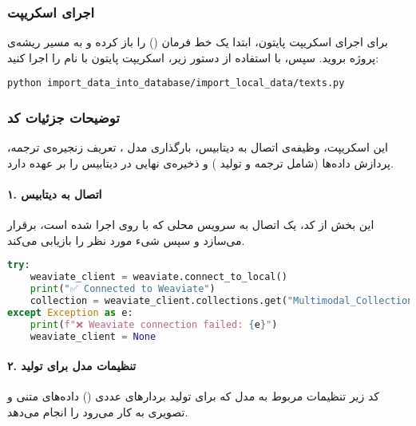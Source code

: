 \documentclass{article}
\begin{document}
\subsubsection{اجرای اسکریپت}

برای اجرای اسکریپت پایتون، ابتدا یک خط فرمان () را باز کرده و به مسیر ریشه‌ی پروژه بروید. سپس، با استفاده از دستور زیر، اسکریپت پایتون با نام  را اجرا کنید:

\begin{latin}
\begin{lstlisting}
python import_data_into_database/import_local_data/texts.py
\end{lstlisting}
\end{latin}

\subsubsection{توضیحات جزئیات کد}

این اسکریپت، وظیفه‌ی اتصال به دیتابیس، بارگذاری مدل ، تعریف زنجیره‌ی ترجمه، پردازش داده‌ها (شامل ترجمه و تولید ) و ذخیره‌ی نهایی در دیتابیس  را بر عهده دارد.

\paragraph{۱. اتصال به دیتابیس }

این بخش از کد، یک اتصال به سرویس محلی  که با  روی  اجرا شده است، برقرار می‌سازد و سپس شیء  مورد نظر را بازیابی می‌کند.

\begin{latin}
\begin{lstlisting}[language=Python]
try:
    weaviate_client = weaviate.connect_to_local()
    print("✅ Connected to Weaviate")
    collection = weaviate_client.collections.get("Multimodal_Collection")
except Exception as e:
    print(f"❌ Weaviate connection failed: {e}")
    weaviate_client = None
\end{lstlisting}
\end{latin}

\paragraph{۲. تنظیمات مدل  برای تولید }

کد زیر تنظیمات مربوط به مدل  که برای تولید بردارهای عددی () داده‌های متنی و تصویری به کار می‌رود را انجام می‌دهد.
\end{document}
